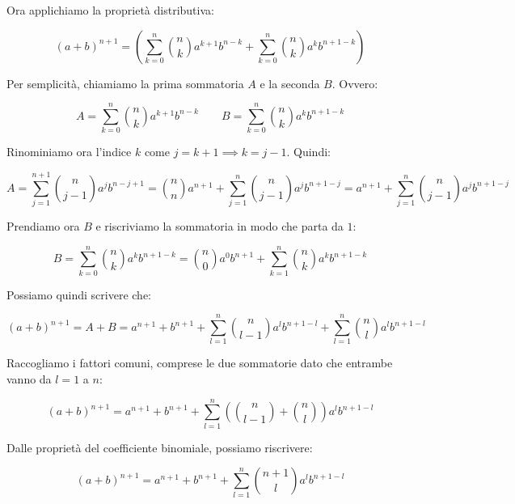 \documentclass{article}
\begin{document}
\noindent Ora applichiamo la proprietà distributiva:

\begin{equation*}
    (a+b)^{n+1} = \left(\sum_{k=0}^n \binom{n}{k} a^{k+1} b^{n-k} + \sum_{k=0}^n \binom{n}{k} a^k b^{n + 1-k}\right)
\end{equation*}

\noindent Per semplicità, chiamiamo la prima sommatoria $A$ e la seconda $B$. Ovvero:

\begin{equation*}
    A = \sum_{k=0}^n \binom{n}{k} a^{k+1} b^{n-k} \qquad B = \sum_{k=0}^n \binom{n}{k} a^k b^{n + 1-k}
\end{equation*}

\noindent Rinominiamo ora l'indice $k$ come $j = k + 1 \implies k = j - 1$. Quindi:

\begin{equation*}
    A = \sum_{j=1}^{n+1} \binom{n}{j-1} a^j b^{n-j+1} = \binom{n}{n} a^{n+1} + \sum_{j=1}^n \binom{n}{j-1} a^j b^{n+1-j} = a^{n+1} + \sum_{j=1}^n \binom{n}{j-1} a^j b^{n+1-j}
\end{equation*}

\noindent Prendiamo ora $B$ e riscriviamo la sommatoria in modo che parta da $1$:

\begin{equation*}
    B = \sum_{k=0}^n \binom{n}{k} a^k b^{n + 1-k} = \binom{n}{0} a^0 b^{n+1} + \sum_{k=1}^n \binom{n}{k} a^k b^{n + 1-k}
\end{equation*}

\noindent Possiamo quindi scrivere che: 

\begin{equation*}
    (a+b)^{n+1} = A + B = a^{n+1} + b^{n+1} + \sum_{l=1}^n \binom{n}{l-1} a^l b^{n+1-l} + \sum_{l=1}^n \binom{n}{l} a^l b^{n + 1-l}
\end{equation*}

\noindent Raccogliamo i fattori comuni, comprese le due sommatorie dato che entrambe vanno da $l = 1$ a $n$:

\begin{equation*}
    (a+b)^{n+1} = a^{n+1} + b^{n+1} + \sum_{l=1}^n \left(\binom{n}{l-1} + \binom{n}{l}\right) a^l b^{n+1-l}
\end{equation*}

\noindent Dalle proprietà del coefficiente binomiale, possiamo riscrivere: 

\begin{equation*}
    (a+b)^{n+1} = a^{n+1} + b^{n+1} + \sum_{l=1}^n \binom{n+1}{l} a^l b^{n+1-l}
\end{equation*}
\end{document}
